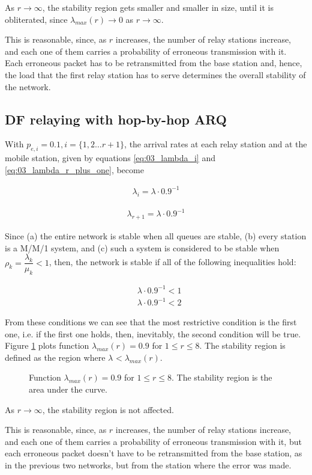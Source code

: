 As $r \to \infty$, the stability region gets smaller and smaller in size, until
it is obliterated, since $\lambda_{max}(r) \to 0$ as $r \to \infty$.

This is reasonable, since, as $r$ increases, the number of relay stations
increase, and each one of them carries a probability of erroneous transmission
with it. Each erroneous packet has to be retransmitted from the base station
and, hence, the load that the first relay station has to serve determines the
overall stability of the network.


\subsection{DF relaying with hop-by-hop ARQ}

With $p_{e,i} = 0.1, i = \{1,2 \dots r+1\}$, the arrival rates at each relay
station and at the mobile station, given by equations \ref{eq:03_lambda_i}
and \ref{eq:03_lambda_r_plus_one}, become

\begin{align}
  \lambda_i = \lambda \cdot 0.9^{-1}
  \label{eq:04_stability_region_df_hbh_lambda_i}
\end{align}

\begin{align}
  \lambda_{r+1} = \lambda \cdot 0.9^{-1}
  \label{eq:04_stability_region_df_hbh_lambda_r_plus_one}
\end{align}

Since (a) the entire network is stable when all queues are stable, (b) every
station is a M/M/1 system, and (c) such a system is considered to be stable
when $\rho_k = \dfrac{\lambda_k}{\mu_k} < 1$, then, the network is stable if all
of the following inequalities hold:

\begin{align*}
  &\lambda \cdot 0.9^{-1} < 1 \\
  &\lambda \cdot 0.9^{-1} < 2
\end{align*}

From these conditions  we can see that the most restrictive condition is the
first one, i.e. if the first one holds, then, inevitably, the second condition
will be true. Figure \ref{fig:04_stability_region_df_hbh} plots function
$\lambda_{max}(r) = 0.9$ for $1 \leq r \leq 8$. The stability
region is defined as the region where $\lambda_{} < \lambda_{max}(r)$.

\begin{figure}[H]\centering
  
  \caption{Function $\lambda_{max}(r) = 0.9$ for $1 \leq r \leq 8$.
    The stability region is the area under the curve.}
  \label{fig:04_stability_region_df_hbh}
\end{figure}

As $r \to \infty$, the stability region is not affected.

This is reasonable, since, as $r$ increases, the number of relay stations
increase, and each one of them carries a probability of erroneous transmission
with it, but each erroneous packet doesn't have to be retransmitted from the
base station, as in the previous two networks, but from the station where the
error was made.

